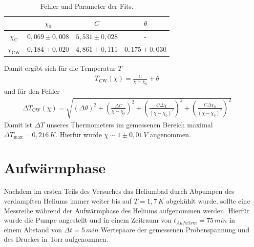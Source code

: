 \documentclass[twoside,colorback,accentcolor=tud4c,11pt]{tudreport}
\begin{document}
\begin{table}[H]
\centering
\begin{tabular}{|c|c|c|c|}
\hline 
 & $ \chi_0 $ & $C$ & $\theta$ \\ 
\hline 
$ \chi_{\text{C}} $ & $ 0,069\pm 0,008 $ & $5,531\pm 0,028 $& - \\ 
\hline 
$ \chi_{\text{CW}} $ & $ 0,184\pm 0,020 $ & $  4,861\pm 0,111$ & $  0,175\pm 0,030$ \\ 
\hline 
\end{tabular} 
\caption{Fehler und Parameter der Fits.}\label{tab:fits}
\end{table}
Damit ergibt sich für die Temperatur $T$
\begin{align}
T_{\text{CW}}(\chi)=\frac{C}{\chi-\chi_0}+\theta
\end{align} 
und für den Fehler
\begin{align}
\Delta T_{\text{CW}}(\chi)=\sqrt{\left(\Delta\theta\right)^2+\left(\frac{\Delta C}{\chi-\chi_0}\right)^2+\left(\frac{C\Delta\chi}{(\chi-\chi_0)^2}\right)^2+\left(\frac{C\Delta\chi_0}{(\chi-\chi_0)^2}\right)^2}
\end{align}
Damit ist $ \Delta T $ unseres Thermometers im gemessenen Bereich maximal $ \Delta T_{\text{max}}=0,216\,\si{K} $. Hierfür wurde $ \chi\sim 1\pm 0,01\,\si{V} $ angenommen.
\section{Aufwärmphase}
Nachdem im ersten Teils des Versuches das Heliumbad durch Abpumpen des verdampften Heliums immer weiter bis auf $T=1,7\,\si{K}$ abgekühlt wurde, sollte eine Messreihe während der Aufwärmphase des Heliums aufgenommen werden. Hierfür wurde die Pumpe angestellt und in einem Zeitraum von $t_{Aufwärm}=75\,\si{min}$ in einem Abstand von $\Delta t=5\,\si{min}$ Wertepaare der gemessenen Probenspannung und des Druckes in Torr aufgenommen.
\end{document}
